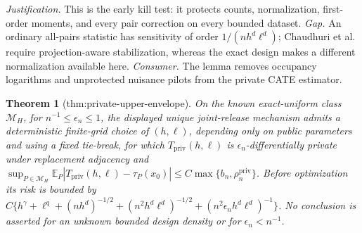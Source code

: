 \documentclass{article}
\newtheorem{theorem}{Theorem}
\begin{document}
\par\smallskip\noindent \textit{Justification.} This is the early kill test: it protects counts, normalization, first-order moments, and every pair correction on every bounded dataset. \textit{Gap.} An ordinary all-pairs statistic has sensitivity of order \(1/(nh^d\ell^d)\); Chaudhuri et al. require projection-aware stabilization, whereas the exact design makes a different normalization available here. \textit{Consumer.} The lemma removes occupancy logarithms and unprotected nuisance pilots from the private CATE estimator.

\begin{theorem}[thm:private-upper-envelope]\label{thm:private-upper-envelope}
On the known exact-uniform class \(\mathcal M_H\), for \(n^{-1}\le\epsilon_n\le1\), the displayed unique joint-release mechanism admits a deterministic finite-grid choice of \((h,\ell)\), depending only on public parameters and using a fixed tie-break, for which \(T_{\mathrm{priv}}(h,\ell)\) is \(\epsilon_n\)-differentially private under replacement adjacency and \(\sup_{P\in\mathcal M_H}\mathbb E_P|T_{\mathrm{priv}}(h,\ell)-\tau_P(x_0)|\le C\max\{b_n,\rho_n^{\mathrm{priv}}\}\). Before optimization its risk is bounded by \(C\{h^\gamma+\ell^q+(nh^d)^{-1/2}+(n^2h^d\ell^d)^{-1/2}+(n^2\epsilon_nh^d\ell^d)^{-1}\}\). No conclusion is asserted for an unknown bounded design density or for \(\epsilon_n<n^{-1}\).
\end{theorem}
\end{document}
